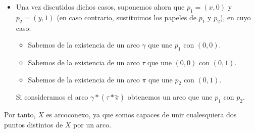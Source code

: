 \begin{ejercicio}
\begin{itemize}
\begin{equation*}
\begin{array}{cl}
                        \left[0,1\right] & \text{si\ } 0 \in \left]a,b\right[
                \end{array}\right.
            \end{equation*}
        \item Una vez discutidos dichos casos, suponemos ahora que $p_1=(x,0)$ y $p_2 = (y,1)$ (en caso contrario, sustituimos los papeles de $p_1$ y $p_2$), en cuyo caso:
            \begin{itemize}
                \item Sabemos de la existencia de un arco $\gamma$ que une $p_1$ con $(0,0)$.
                \item Sabemos de la existencia de un arco $\tau$ que une $(0,0)$ con $(0,1)$.
                \item Sabemos de la existencia de un arco $\pi$ que une $p_2$ con $(0,1)$.
            \end{itemize}
            Si consideramos el arco $\gamma \ast (\tau \ast \tilde{\pi})$ obtenemos un arco que une $p_1$ con $p_2$.
    \end{itemize} 
    Por tanto, $X$ es arcoconexo, ya que somos capaces de unir cualesquiera dos puntos distintos de $X$ por un arco.\\


\end{ejercicio}
